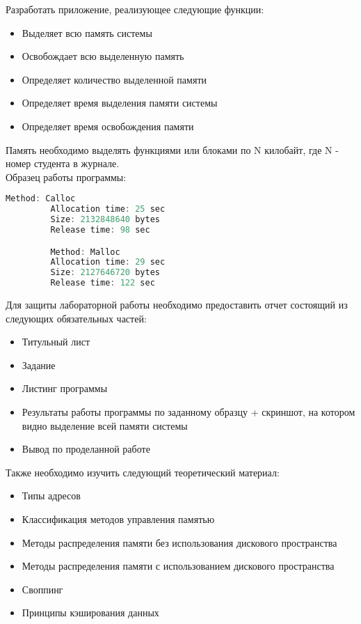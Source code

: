 \documentclass[a4paper,12pt]{article}
\begin{document}
  
  \begin{flushleft}
    Разработать приложение, реализующее следующие функции:
    \begin{itemize}
      \item Выделяет всю память системы
      \item Освобождает всю выделенную память
      \item Определяет количество выделенной памяти
      \item Определяет время выделения памяти системы
      \item Определяет время освобождения памяти
    \end{itemize}
  \end{flushleft}
  
  Память необходимо выделять функциями  или  блоками по N килобайт, где N - номер студента в журнале. \\

  Образец работы программы:
  \begin{flushleft}
    \begin{lstlisting}[language=c, 
                      breaklines=true, 
                      showtabs=false, 
                      showspaces=false, 
                      showstringspaces=false,
                      basicstyle=\ttfamily \footnotesize]
         Method: Calloc 
         Allocation time: 25 sec 
         Size: 2132848640 bytes 
         Release time: 98 sec

         Method: Malloc 
         Allocation time: 29 sec 
         Size: 2127646720 bytes 
         Release time: 122 sec
    \end{lstlisting}
  \end{flushleft}

  Для защиты лабораторной работы необходимо предоставить отчет состоящий из следующих обязательных частей:
  \begin{itemize}
    \item Титульный лист
    \item Задание
    \item Листинг программы
    \item Результаты работы программы по заданному образцу + скриншот, на котором видно выделение всей памяти системы
    \item Вывод по проделанной работе
  \end{itemize}
  
  Также необходимо изучить следующий теоретический материал:
  \begin{itemize}
    \item Типы адресов
    \item Классификация методов управления памятью
    \item Методы распределения памяти без использования дискового пространства
    \item Методы распределения памяти с использованием дискового пространства
    \item Своппинг
    \item Принципы кэширования данных
  \end{itemize}
\end{document}
